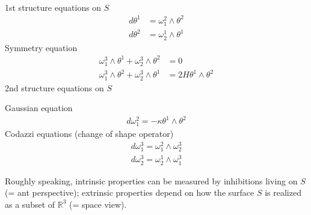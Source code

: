 \documentclass[10pt]{article}
\begin{document}
            \begin{theorem}\quad\\
                1st structure equations on $S$
                \begin{equation*}
                    \begin{aligned}
                        d\theta^1 &= \omega_1^2\wedge\theta^2 \\
                        d\theta^2 &= \omega_2^1\wedge\theta^1
                    \end{aligned}
                \end{equation*}
                Symmetry equation
                \begin{equation*}
                    \begin{aligned}
                        \omega_1^3\wedge\theta^1 + \omega_2^3\wedge\theta^2 &= 0 \\
                        \omega_1^3\wedge\theta^2 + \omega_2^3\wedge\theta^1 &= 2H\theta^1\wedge\theta^2
                    \end{aligned}
                \end{equation*}
                2nd structure equations on $S$
                
                Gaussian equation
                \begin{equation*}
                    \begin{aligned}
                        d\omega_1^2 = -\kappa\theta^1\wedge\theta^2
                    \end{aligned}
                \end{equation*}
                Codazzi equations (change of shape operator)
                \begin{equation*}
                    \begin{aligned}
                        d\omega_1^3 = \omega_1^2\wedge\omega_2^3 \\
                        d\omega_2^3 = \omega_2^1\wedge\omega_1^3
                    \end{aligned}
                \end{equation*}
            \end{theorem}
            \begin{remark}
                Roughly speaking, intrinsic properties can be measured by inhibitions living on $S$ (= ant perspective); extrinsic properties depend on how the surface $S$ is realized as a subset of $\mathbb{R}^3$ (= space view).
            \end{remark}
\end{document}
